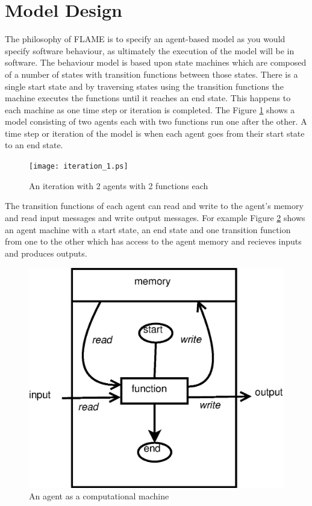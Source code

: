 \section{Model Design}
\label{sec:model_design}

The philosophy of FLAME is to specify an agent-based model as you would specify
software behaviour, as ultimately the execution of the model will be in software.
The behaviour model is based upon state machines which are composed of a number
of states with transition functions between those states. There is a single
start state and by traversing states using the transition functions the machine
executes the functions until it reaches an end state. This happens to each
machine as one time step or iteration is completed. The Figure
\ref{fig:iteration_1} shows a model consisting of two agents each with two
functions run one after the other. A time step or iteration of the model is when
each agent goes from their start state to an end state.

\begin{figure}[ht]
\begin{center}
\texttt{[image: iteration\_1.ps]}
\caption{An iteration with 2 agents with 2 functions each}
\label{fig:iteration_1}
\end{center}
\end{figure}

The transition functions of each agent can read and write to the agent's memory
and read input messages and write output messages. For example Figure \ref{fig:xmachine} shows
an agent machine with a start state, an end state and one transition function
from one to the other which has access to the agent memory and recieves inputs
and produces outputs.

\begin{figure}[ht]
\begin{center}
\includegraphics*[scale=0.5]{xmachine.eps}
\caption{An agent as a computational machine}
\label{fig:xmachine}
\end{center}
\end{figure}

